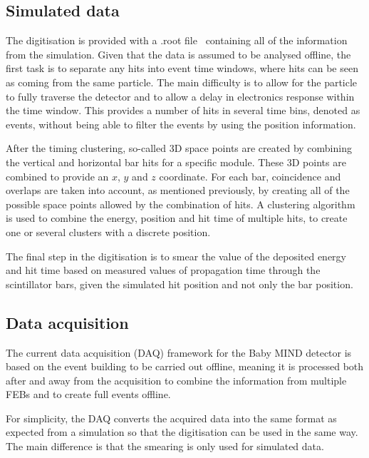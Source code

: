 \subsection{Simulated data}

The digitisation is provided with a .root file~\cite{Root} containing all of the information from the simulation. Given that the data is assumed to be analysed offline, the first task is to separate any hits into event time windows, where hits can be seen as coming from the same particle. The main difficulty is to allow for the particle to fully traverse the detector and to allow a delay in electronics response within the time window. This provides a number of hits in several time bins, denoted as events, without being able to filter the events by using the position information.

After the timing clustering, so-called 3D space points are created by combining the vertical and horizontal bar hits for a specific module. These 3D points are combined to provide an $x$, $y$ and $z$ coordinate. For each bar, coincidence and overlaps are taken into account, as mentioned previously, by creating all of the possible space points allowed by the combination of hits. A clustering algorithm is used to combine the energy, position and hit time of multiple hits, to create one or several clusters with a discrete position.%

The final step in the digitisation is to smear the value of the deposited energy and hit time based on measured values of propagation time through the scintillator bars, given the simulated hit position and not only the bar position.

\subsection{Data acquisition}

The current data acquisition (DAQ) framework for the Baby MIND detector is based on the event building to be carried out offline,  meaning it is processed both after and away from the acquisition to combine the information from multiple FEBs and to create full events offline.

For simplicity, the DAQ converts the acquired data into the same format as expected from a simulation so that the digitisation can be used in the same way. The main difference is that the smearing is only used for simulated data.

